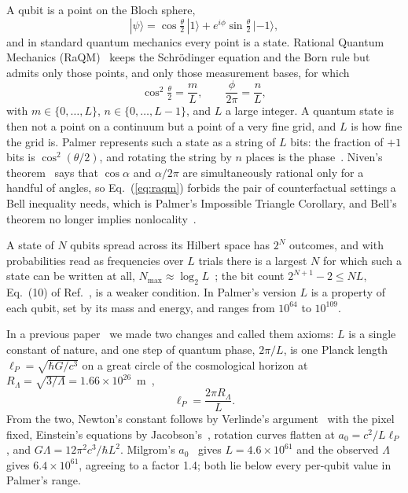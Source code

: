 \documentclass[aps,prd,twocolumn,superscriptaddress,nofootinbib]{revtex4-2}
\begin{document}
A qubit is a point on the Bloch sphere,
\begin{equation}
|\psi\rangle = \cos\tfrac{\theta}{2}\,|1\rangle + e^{i\phi}\sin\tfrac{\theta}{2}\,|{-1}\rangle ,
\label{eq:qubit}
\end{equation}
and in standard quantum mechanics every point is a state. Rational Quantum Mechanics (RaQM)~\cite{palmer2020,palmer2026,palmer2026b,palmer2026c} keeps the Schr\"odinger equation and the Born rule but admits only those points, and only those measurement bases, for which
\begin{equation}
\cos^2\tfrac{\theta}{2} = \frac{m}{L},\qquad \frac{\phi}{2\pi} = \frac{n}{L},
\label{eq:raqm}
\end{equation}
with $m\in\{0,\dots,L\}$, $n\in\{0,\dots,L-1\}$, and $L$ a large integer. A quantum state is then not a point on a continuum but a point of a very fine grid, and $L$ is how fine the grid is. Palmer represents such a state as a string of $L$ bits: the fraction of $+1$ bits is $\cos^2(\theta/2)$, and rotating the string by $n$ places is the phase~\cite{palmer2026}. Niven's theorem~\cite{niven1956} says that $\cos\alpha$ and $\alpha/2\pi$ are simultaneously rational only for a handful of angles, so Eq.~(\ref{eq:raqm}) forbids the pair of counterfactual settings a Bell inequality needs, which is Palmer's Impossible Triangle Corollary, and Bell's theorem no longer implies nonlocality~\cite{palmer2020,palmer2026b}.

A state of $N$ qubits spread across its Hilbert space has $2^N$ outcomes, and with probabilities read as frequencies over $L$ trials there is a largest $N$ for which such a state can be written at all, $N_{\max}\approx\log_2L$~\cite{palmer2026}; the bit count $2^{N+1}-2 \le NL$, Eq.~(10) of Ref.~\cite{palmer2026c}, is a weaker condition. In Palmer's version $L$ is a property of each qubit, set by its mass and energy, and ranges from $10^{64}$ to $10^{109}$.

In a previous paper~\cite{korytko2026} we made two changes and called them axioms: $L$ is a single constant of nature, and one step of quantum phase, $2\pi/L$, is one Planck length $\ell_P = \sqrt{\hbar G/c^3}$ on a great circle of the cosmological horizon at $R_\Lambda = \sqrt{3/\Lambda} = 1.66\times10^{26}$~m~\cite{planck2018},
\begin{equation}
\ell_P = \frac{2\pi R_\Lambda}{L} .
\label{eq:ident}
\end{equation}
From the two, Newton's constant follows by Verlinde's argument~\cite{verlinde2011} with the pixel fixed, Einstein's equations by Jacobson's~\cite{jacobson1995}, rotation curves flatten at $a_0 = c^2/L\ell_P$, and $G\Lambda = 12\pi^2c^3/\hbar L^2$. Milgrom's $a_0$~\cite{milgrom1983,mcgaugh2016} gives $L = 4.6\times10^{61}$ and the observed $\Lambda$ gives $6.4\times10^{61}$, agreeing to a factor 1.4; both lie below every per-qubit value in Palmer's range.
\end{document}
